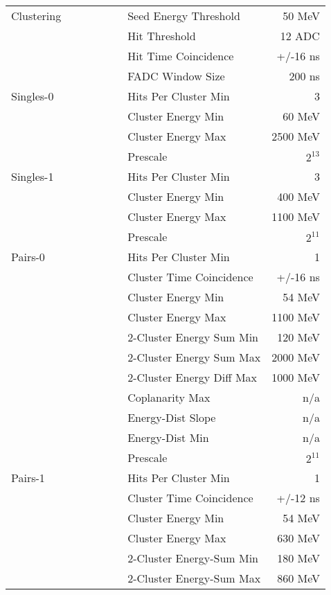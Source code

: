 \documentclass[amsmath,amssymb,notitlepage,11pt]{revtex4-1}
\begin{document}
{
\begin{table}[htbp]\centering
  \begin{tabular}{llr}\toprule[1.5pt]
Clustering\ \ \ \ \ \ \ \ \ \ 
&Seed Energy Threshold&        50 MeV\\
&Hit Threshold&   12 ADC\\
&Hit Time Coincidence&         +/-16 ns\\
&FADC Window Size&     200 ns\\ \cmidrule[0.5pt]{1-3}
Singles-0
&Hits Per Cluster Min&             3\\
&Cluster Energy Min&              60 MeV\\
&Cluster Energy Max&            2500 MeV\\
&Prescale& $2^{13}$ \\ \cmidrule[0.5pt]{1-3}
Singles-1
&Hits Per Cluster Min&             3\\
&Cluster Energy Min&             400 MeV\\
&Cluster Energy Max&            1100 MeV\\
&Prescale& $2^{11}$ \\ \cmidrule[0.5pt]{1-3}
Pairs-0
&Hits Per Cluster Min&             1\\
&Cluster Time Coincidence&     +/-16 ns\\
&Cluster Energy Min&              54 MeV\\
&Cluster Energy Max&            1100 MeV\\
&2-Cluster Energy Sum Min&       120 MeV\\
&2-Cluster Energy Sum Max&      2000 MeV\\
&2-Cluster Energy Diff Max&     1000 MeV\\
&Coplanarity Max&                n/a\\
&Energy-Dist Slope&              n/a\\
&Energy-Dist Min&                n/a\\
&Prescale& $2^{11}$ \\ \cmidrule[0.5pt]{1-3}
Pairs-1
&Hits Per Cluster Min&             1\\
&Cluster Time Coincidence&     +/-12 ns\\
&Cluster Energy Min&              54 MeV\\
&Cluster Energy Max&             630 MeV\\
&2-Cluster Energy-Sum Min&       180 MeV\\
&2-Cluster Energy-Sum Max&       860 MeV\\

\end{tabular}
\end{table}}
\end{document}

